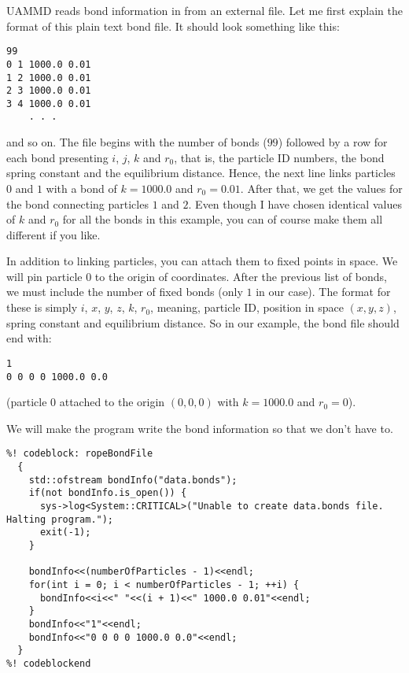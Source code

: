 UAMMD reads bond information in from an external file. Let me first explain the
format of this plain text bond file. It should look something like this:
\begin{lstlisting}
99
0 1 1000.0 0.01
1 2 1000.0 0.01
2 3 1000.0 0.01
3 4 1000.0 0.01
    . . .
\end{lstlisting}

and so on. The file begins with the number of bonds ($99$) followed by a row for
each bond presenting $i$, $j$, $k$ and $r_0$, that is, the particle ID numbers,
the bond spring constant and the equilibrium distance. Hence, the next line
links particles $0$ and $1$ with a bond of $k = 1000.0$ and $r_0 = 0.01$. After
that, we get the values for the bond connecting particles $1$ and $2$. Even
though I have chosen identical values of $k$ and $r_0$ for all the bonds in this
example, you can of course make them all different if you like.

In addition to linking particles, you can attach them to fixed points in space.
We will pin particle $0$ to the origin of coordinates. After the previous list
of bonds, we must include the number of fixed bonds (only $1$ in our case). The
format for these is simply $i$, $x$, $y$, $z$, $k$, $r_0$, meaning, particle ID,
position in space $(x, y, z)$, spring constant and equilibrium distance. So in
our example, the bond file should end with:
\begin{lstlisting}
1
0 0 0 0 1000.0 0.0
\end{lstlisting}
(particle $0$ attached to the origin $(0, 0, 0)$ with $k = 1000.0$ and
$r_0 = 0$).

We will make the program write the bond information so that we don't have to.
\begin{lstlisting}
%! codeblock: ropeBondFile
  {
    std::ofstream bondInfo("data.bonds");
    if(not bondInfo.is_open()) {
      sys->log<System::CRITICAL>("Unable to create data.bonds file. Halting program.");
      exit(-1);
    }

    bondInfo<<(numberOfParticles - 1)<<endl;
    for(int i = 0; i < numberOfParticles - 1; ++i) {
      bondInfo<<i<<" "<<(i + 1)<<" 1000.0 0.01"<<endl;
    }
    bondInfo<<"1"<<endl;
    bondInfo<<"0 0 0 0 1000.0 0.0"<<endl;
  }
%! codeblockend
\end{lstlisting}

